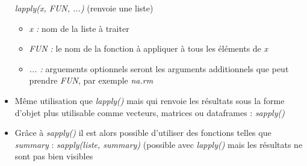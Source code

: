 \documentclass[12pt,a4paper]{article}
\begin{document}
\begin{itemize}
\newline \textit{lapply(x, FUN, ...)} (renvoie une liste)
\begin{itemize}
\item \textit{x : } nom de la liste à traiter
\item \textit{FUN : } le nom de la fonction à appliquer à tous les éléments de \textit{x}
\item \textit{... : } arguements optionnels seront les arguments additionnels que peut prendre \textit{FUN}, par exemple \textit{na.rm}
\end{itemize}
\item Même utilisation que \textit{lapply()} mais qui renvoie les résultats sous la forme d'objet plus utilisable comme vecteurs, matrices ou dataframes : \textit{sapply()}\\
\item Grâce à \textit{sapply()} il est alors possible d'utiliser des fonctions telles que \textit{summary} : \textit{sapply(liste, summary)}
\newline (possible avec \textit{lapply()} mais les résultats ne sont pas bien visibles
\end{itemize}
\end{document}
